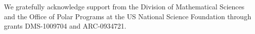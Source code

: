 \documentclass[english,12pt,jmp,graphicx]{revtex4-1}
\begin{document}

%
%

%

\begin{acknowledgments}
We gratefully acknowledge support from the Division of Mathematical
Sciences and the Office of Polar Programs at the US National Science
Foundation through grants DMS-1009704 and ARC-0934721.
\end{acknowledgments}



\end{document}

